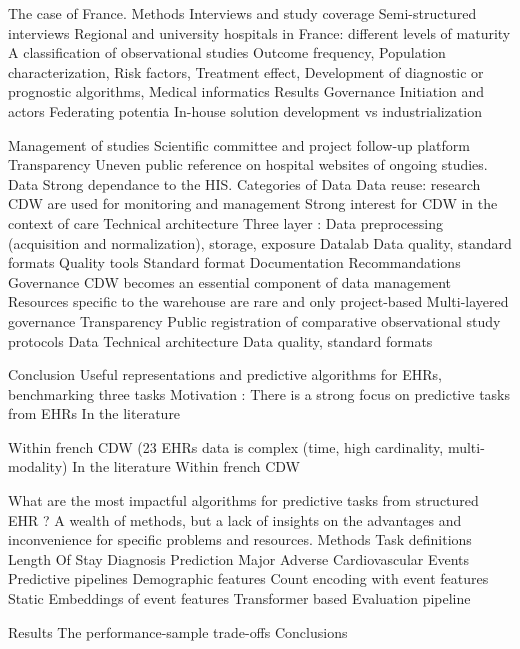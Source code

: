 The case of France.
Methods
Interviews and study coverage
Semi-structured interviews
Regional and university hospitals in France: different levels of maturity
A classification of observational studies
Outcome frequency, Population characterization, Risk factors, Treatment effect, Development of diagnostic or prognostic algorithms, Medical informatics
Results
Governance
Initiation and actors
Federating potentia
In-house solution development vs industrialization

Management of studies
Scientific committee and project follow-up platform
Transparency
Uneven public reference on hospital websites of ongoing studies.
Data
Strong dependance to the HIS.
Categories of Data
Data reuse: research
CDW are used for monitoring and management
Strong interest for CDW in the context of care
Technical architecture
Three layer : Data preprocessing (acquisition and normalization), storage, exposure
Datalab
Data quality, standard formats
Quality tools
Standard format
Documentation
Recommandations
Governance
CDW becomes an essential component of data management
Resources specific to the warehouse are rare and only project-based
Multi-layered governance
Transparency
Public registration of comparative observational study protocols
Data
Technical architecture
Data quality, standard formats

Conclusion
Useful representations and predictive algorithms for EHRs, benchmarking three tasks
Motivation :
There is a strong focus on predictive tasks from EHRs
In the literature

Within french CDW (23 %
EHRs data is complex (time, high cardinality, multi-modality)
In the literature
Within french CDW

What are the most impactful algorithms for predictive tasks from structured EHR ?
A wealth of methods, but a lack of insights on the advantages and inconvenience for specific problems and resources.
Methods
Task definitions
Length Of Stay
Diagnosis Prediction
Major Adverse Cardiovascular Events
Predictive pipelines
Demographic features
Count encoding with event features
Static Embeddings of event features
Transformer based
Evaluation pipeline

Results
The performance-sample trade-offs
Conclusions

